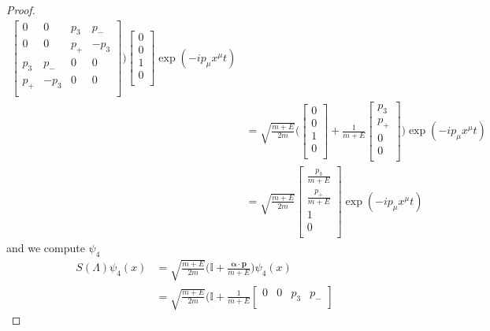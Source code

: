 \begin{proof}
\begin{equation*}
\begin{aligned}
\begin{bmatrix}
                0 & 0 & p_3 & p_- \\
                0 & 0 & p_+ & - p_3 \\
                p_3 & p_- & 0 & 0 \\
                p_+ & -p_3 & 0 & 0 \\
            \end{bmatrix} \Big) \begin{bmatrix}
                0 \\ 0 \\ 1 \\ 0 \\
            \end{bmatrix} \exp(- i p_\mu x^\mu t) \\ & = \sqrt{\frac{m + E}{2m}} \Big ( \begin{bmatrix}
                0 \\ 0 \\ 1 \\ 0 \\
            \end{bmatrix} + \frac{1}{m + E} \begin{bmatrix}
                p_3 \\ p_+ \\ 0 \\ 0 \\
            \end{bmatrix} \Big) \exp(- i p_\mu x^\mu t) \\ & = \sqrt{\frac{m + E}{2m}} \begin{bmatrix}
                \frac{p_3 }{m+E}\\ \frac{p_+}{m+E} \\ 1 \\ 0 \\
            \end{bmatrix} \exp(-ip_\mu x^\mu t)
        \end{aligned}
        \end{equation*}
        and we compute $\psi_4$ 
        \begin{equation*}
        \begin{aligned}
            S(\Lambda) \psi_4 (x) & = \sqrt{\frac{m + E}{2m}} \Big ( \mathbb I + \frac{\boldsymbol \alpha \cdot \mathbf p}{m + E}\Big) \psi_4 (x) \\ & = \sqrt{\frac{m + E}{2m}} \Big ( \mathbb I + \frac{1}{m + E} \begin{bmatrix}
                0 & 0 & p_3 & p_- \\

\end{bmatrix}
\end{aligned}
\end{equation*}
\end{proof}

